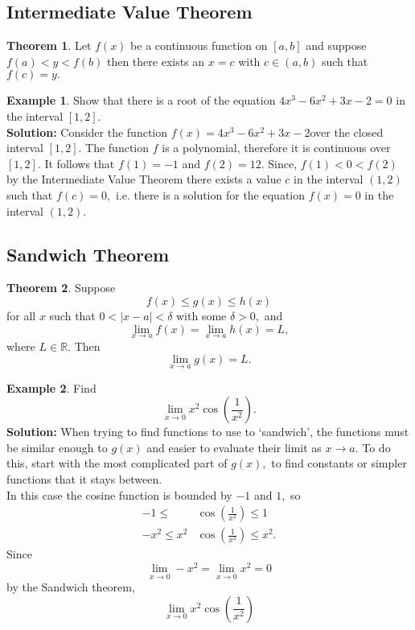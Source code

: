 \documentclass[12pt, a4paper]{article}
\newcommand{\bb}[1]{\mathbb{#1}}
\newcommand{\f}[2]{\frac{#1}{#2}}
\theoremstyle{definition}
\newtheorem{theorem}{Theorem}[section]
\newtheorem*{example}{Example}
\theoremstyle{plain}
\begin{document}
\subsection{Intermediate Value Theorem}

\begin{theorem}
Let $f(x)$ be a continuous function on $[a,b]$ and suppose $f(a) < y < f(b)$ then there exists an $x = c$ with $c \in (a,b)$ such that $f(c) = y.$
\end{theorem}

\begin{example}
Show that there is a root of the equation $4x^3-6x^2+3x-2=0$ in the interval $[1,2].$ \\
\textbf{Solution:} Consider the function $f(x)=4x^3-6x^2+3x-2$over the closed interval $[1,2].$ The function $f$ is a polynomial, therefore it is continuous over $[1,2].$ It follows that $f(1) =-1$ and $f(2)=12.$ Since, $f(1)<0<f(2)$ by the Intermediate Value Theorem there exists a value $c$ in the interval $(1,2)$ such that $f(c)=0,$ i.e. there is a solution for the equation $f(x)=0$ in the interval $(1,2).$
\end{example}

\subsection{Sandwich Theorem}

\begin{theorem}
Suppose $$f(x)\leq g(x) \leq h(x)$$ for all $x$ such that $0<|x-a|<\delta$ with some $\delta>0,$ and $$\lim_{x\to a} f(x)=\lim_{x\to a} h(x)=L,$$ where $L\in \bb{R}.$ Then $$\lim_{x\to a} g(x)=L.$$
\end{theorem}

\begin{example}
Find $$\lim_{x\to 0} x^2\cos\left(\f{1}{x^2}\right).$$ 
\textbf{Solution:} When trying to find functions to use to `sandwich', the functions must be similar enough to $g(x)$ and easier to evaluate their limit as $x\to a.$ To do this, start with the most complicated part of $g(x),$ to find constants or simpler functions that it stays between. \\
In this case the cosine function is bounded by $-1$ and $1,$ so $$\begin{aligned}
-1 \leq &\cos\left(\f{1}{x^2}\right) \leq 1 \\
-x^2\leq x^2&\cos\left(\f{1}{x^2}\right) \leq x^2.
\end{aligned}$$ Since $$\lim_{x\to 0} -x^2=\lim_{x\to 0} x^2=0$$ by the Sandwich theorem, $$\lim_{x\to0}x^2\cos\left(\f{1}{x^2}\right)$$
\end{example}
	
\end{document}
